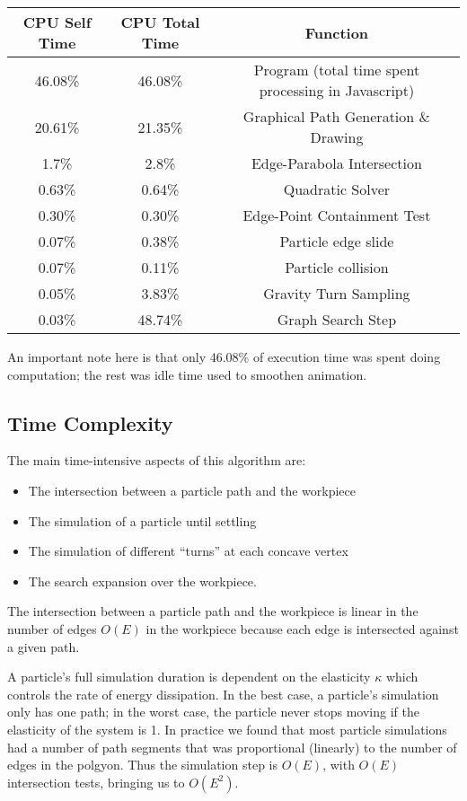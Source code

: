 \begin{table}
\begin{tabular}{|c|c|c|}
\hline
CPU Self Time & CPU Total Time & Function \\ \hline
46.08\% & 46.08\% & Program (total time spent processing in Javascript) \\
20.61\% & 21.35\% & Graphical Path Generation \& Drawing \\
1.7\% & 2.8\% & Edge-Parabola Intersection \\
0.63\% & 0.64\% & Quadratic Solver \\
0.30\% & 0.30\% & Edge-Point Containment Test \\
0.07\% & 0.38\% & Particle edge slide \\
0.07\% & 0.11\% & Particle collision \\
0.05\% & 3.83\% & Gravity Turn Sampling \\
0.03\% & 48.74\% & Graph Search Step \\
\hline
\end{tabular}
\end{table}

An important note here is that only 46.08\% of execution time was spent doing computation; the rest was idle time used to smoothen animation.

	\subsection{Time Complexity}

The main time-intensive aspects of this algorithm are:

\begin{itemize}
\item The intersection between a particle path and the workpiece
\item The simulation of a particle until settling
\item The simulation of different ``turns'' at each concave vertex
\item The search expansion over the workpiece.
\end{itemize}

The intersection between a particle path and the workpiece is linear in the number of edges $O(E)$ in the workpiece because each edge is intersected against a given path.

A particle's full simulation duration is dependent on the elasticity $\kappa$ which controls the rate of energy dissipation. In the best case, a particle's simulation only has one path; in the worst case, the particle never stops moving if the elasticity of the system is 1. In practice we found that most particle simulations had a number of path segments that was proportional (linearly) to the number of edges in the polgyon. Thus the simulation step is $O(E)$, with $O(E)$ intersection tests, bringing us to $O(E^2).$


